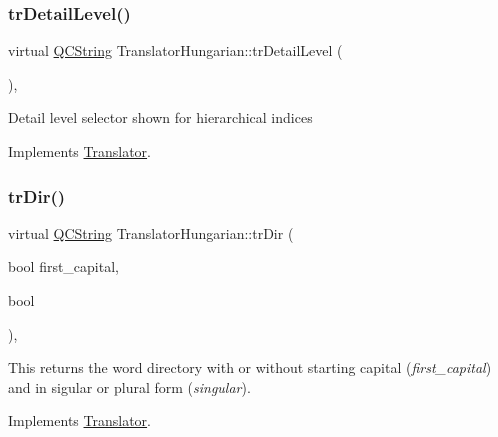 \mbox{\label{class_translator_hungarian_a62288ba9811e397c27717875d2148418}} 
\subsubsection{\texorpdfstring{trDetailLevel()}{trDetailLevel()}}
{\footnotesize\ttfamily virtual \mbox{\hyperlink{class_q_c_string}{Q\+C\+String}} Translator\+Hungarian\+::tr\+Detail\+Level (\begin{DoxyParamCaption}{ }\end{DoxyParamCaption})\hspace{0.3cm}{\ttfamily [inline]}, {\ttfamily [virtual]}}

Detail level selector shown for hierarchical indices 

Implements \mbox{\hyperlink{class_translator}{Translator}}.

\mbox{\label{class_translator_hungarian_a269aaa56f3754bbc599b865351383b47}} 
\subsubsection{\texorpdfstring{trDir()}{trDir()}}
{\footnotesize\ttfamily virtual \mbox{\hyperlink{class_q_c_string}{Q\+C\+String}} Translator\+Hungarian\+::tr\+Dir (\begin{DoxyParamCaption}\item[{bool}]{first\+\_\+capital,  }\item[{bool}]{ }\end{DoxyParamCaption})\hspace{0.3cm}{\ttfamily [inline]}, {\ttfamily [virtual]}}

This returns the word directory with or without starting capital ({\itshape first\+\_\+capital}) and in sigular or plural form ({\itshape singular}). 

Implements \mbox{\hyperlink{class_translator}{Translator}}.

\mbox{\label{class_translator_hungarian_a8136e528d29f47f2a74a26ddcba2fb61}} 
